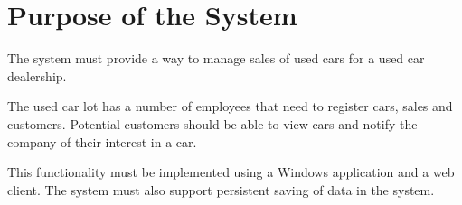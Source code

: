 \section{Purpose of the System}
The system must provide a way to manage sales of used cars for a used car dealership.

The used car lot has a number of employees that need to register cars, sales and customers. Potential customers should be able to view cars and notify the company of their interest in a car. 

This functionality must be implemented using a Windows application and a web client. The system must also support persistent saving of data in the system.